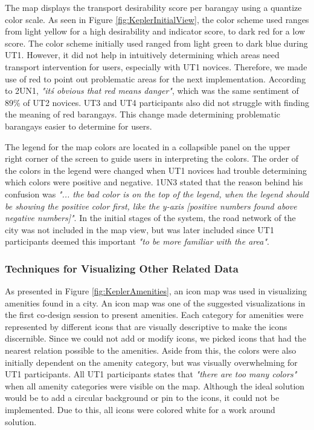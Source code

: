 \documentclass{sigchi}
\begin{document}
The map displays the transport desirability score per barangay using a quantize color scale. As seen in Figure \ref{fig:KeplerInitialView}, the color scheme used ranges from light yellow for a high desirability and indicator score, to dark red for a low score. The color scheme initially used ranged from light green to dark blue during UT1. However, it did not help in intuitively determining which areas need transport intervention for users, especially with UT1 novices. Therefore, we made use of red to point out problematic areas for the next implementation. According to 2UN1, \textit{"it\'s obvious that red means danger"}, which was the same sentiment of 89\% of UT2 novices. UT3 and UT4 participants also did not struggle with finding the meaning of red barangays. This change made determining problematic barangays easier to determine for users. 

The legend for the map colors are located in a collapsible panel on the upper right corner of the screen to guide users in interpreting the colors. The order of the colors in the legend were changed when UT1 novices had trouble determining which colors were positive and negative. 1UN3 stated that the reason behind his confusion was \textit{"... the bad color is on the top of the legend, when the legend should be showing the positive color first, like the y-axis [positive numbers found above negative numbers]"}. In the initial stages of the system, the road network of the city was not included in the map view, but was later included since UT1 participants deemed this important \textit{"to be more familiar with the area"}.

\subsubsection{Techniques for Visualizing Other Related Data}
As presented in Figure \ref{fig:KeplerAmenities}, an icon map was used in visualizing amenities found in a city. An icon map was one of the suggested visualizations in the first co-design session to present amenities. Each category for amenities were represented by different icons that are visually descriptive to make the icons discernible. Since we could not add or modify icons, we picked icons that had the nearest relation possible to the amenities. Aside from this, the colors were also initially dependent on the amenity category, but was visually overwhelming for UT1 participants. All UT1 participants states that \textit{"there are too many colors"} when all amenity categories were visible on the map. Although the ideal solution would be to add a circular background or pin to the icons, it could not be implemented. Due to this, all icons were colored white for a work around solution.
\end{document}
